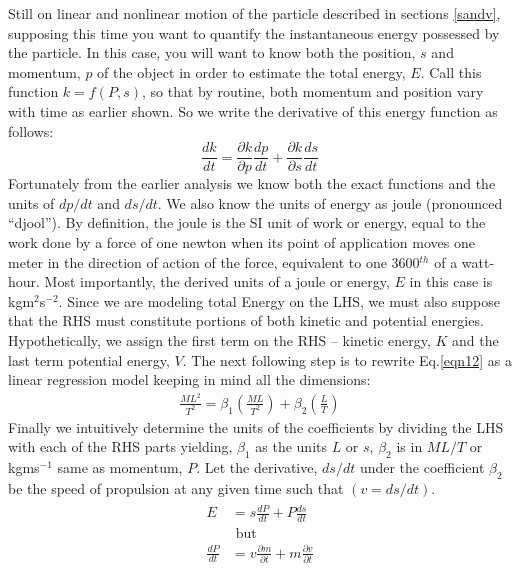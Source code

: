 \noindent Still on linear and nonlinear motion of the particle described in sections \ref{sandv}, supposing this time you want to quantify the instantaneous energy possessed by the particle. In this case, you will want to know both the position, $s$ and momentum, $p$ of the object in order to estimate the total energy, $E$. Call this function $k=f\left(P,s\right)$, so that by routine, both momentum and position vary with time as earlier shown. So we write the derivative of this energy function as follows:  
\begin{equation}
\frac{dk}{dt}= \frac{\partial k}{\partial p}\frac{dp}{dt}+\frac{\partial k}{\partial s}\frac{ds}{dt}
\label{eqn12}
\end{equation}
\noindent Fortunately from the earlier analysis we know both the exact functions and the units of $dp/dt$ and $ds/dt$. We also know the units of energy as joule (pronounced ``djool''). By definition, the joule is the SI unit of work or energy, equal to the work done by a force of one newton when its point of application moves one meter in the direction of action of the force, equivalent to one 3600$^{th}$ of a watt-hour. Most importantly, the derived units of a joule or energy, $E$ in this case is kgm$^{2}$s$^{-2}$. Since we are modeling total Energy on the LHS, we must also suppose that the RHS must constitute portions of both kinetic and potential energies. Hypothetically, we assign the first term on the RHS -- kinetic energy, $K$ and the last term potential energy, $V$. The next following step is to rewrite Eq.\ref{eqn12} as a linear regression model keeping in mind all the dimensions:
\begin{eqnarray}
\frac{ML^2}{T^2} = \beta_1\left( \frac{ML}{T^2}\right) +\beta_2\left( \frac{L}{T}\right) 
\label{eqn2.13}
\end{eqnarray}
\noindent Finally we intuitively determine the units of the coefficients by dividing the LHS with each of the RHS parts yielding, $\beta_1$ as the units $L$ or $s$, $\beta_2$ is in $ML/T$ or kgms$^{-1}$ same as momentum, $P$. Let the derivative, $ds/dt$ under the coefficient $\beta_2$ be the speed of propulsion at any given time such that $\left(v = ds/dt\right)$. 
\begin{eqnarray}
\begin{split}
E &= s\frac{dP}{dt} + P\frac{ds}{dt}\\ &\text{ but} \\
\frac{dP}{dt} &= v\frac{\partial m}{\partial t}+ m\frac{\partial v}{\partial t}
\end{split}
\label{eqn2.14} 
\end{eqnarray}
